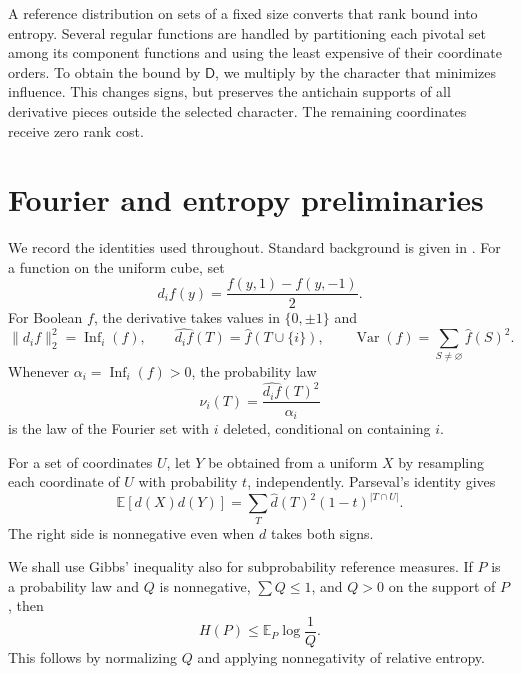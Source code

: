 \documentclass[11pt]{amsart}
\theoremstyle{definition}
\theoremstyle{remark}
\newcommand{\E}{\mathbb E}
\newcommand{\D}{\mathsf D}
\DeclareMathOperator{\Var}{Var}
\DeclareMathOperator{\Inf}{Inf}
\newcommand{\wh}[1]{\widehat{#1}}
\begin{document}
A reference distribution on sets of a fixed size converts that rank bound into entropy. Several regular functions are handled by partitioning each pivotal set among its component functions and using the least expensive of their coordinate orders. To obtain the bound by $\D$, we multiply by the character that minimizes influence. This changes signs, but preserves the antichain supports of all derivative pieces outside the selected character. The remaining coordinates receive zero rank cost.

\section{Fourier and entropy preliminaries}\label{sec:prelim}

We record the identities used throughout. Standard background is given in \cite{OD14}.
For a function on the uniform cube, set
\[
 d_i f(y)=\frac{f(y,1)-f(y,-1)}2.
\]
For Boolean $f$, the derivative takes values in $\{0,\pm1\}$ and
\begin{equation}\label{eq:derivative}
 \|d_i f\|_2^2=\Inf_i(f),\qquad
 \wh{d_i f}(T)=\wh f(T\cup\{i\}),\qquad
 \Var(f)=\sum_{S\ne\varnothing}\wh f(S)^2.
\end{equation}
Whenever $\alpha_i=\Inf_i(f)>0$, the probability law
\begin{equation}\label{eq:derivlaw}
 \nu_i(T)=\frac{\wh{d_i f}(T)^2}{\alpha_i}
\end{equation}
is the law of the Fourier set with $i$ deleted, conditional on containing $i$.

For a set of coordinates $U$, let $Y$ be obtained from a uniform $X$ by resampling each coordinate of $U$ with probability $t$, independently. Parseval's identity gives
\begin{equation}\label{eq:partialnoise}
 \E[d(X)d(Y)]=\sum_T\wh d(T)^2(1-t)^{|T\cap U|}.
\end{equation}
The right side is nonnegative even when $d$ takes both signs.

We shall use Gibbs' inequality also for subprobability reference measures. If $P$ is a probability law and $Q$ is nonnegative, $\sum Q\le1$, and $Q>0$ on the support of $P$, then
\begin{equation}\label{eq:gibbs}
 H(P)\le \E_P\log\frac1{Q}.
\end{equation}
This follows by normalizing $Q$ and applying nonnegativity of relative entropy.
\end{document}
